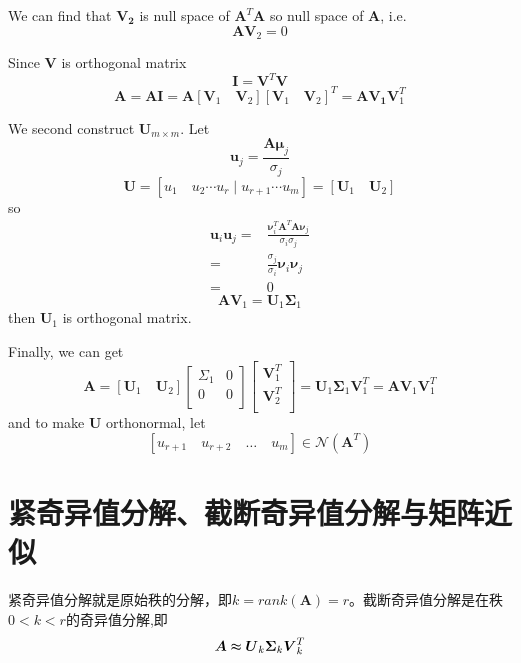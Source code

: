 \documentclass{article}
\begin{document}
        We can find that $\boldsymbol{V_2}$ is null space of $\boldsymbol{A}^T\boldsymbol{A}$ so null space of $\boldsymbol{A}$, i.e.
        \[\boldsymbol{A}\boldsymbol{V}_2=0\]

        Since $\boldsymbol{V}$ is orthogonal matrix
        \[\boldsymbol{I}=\boldsymbol{V}^T\boldsymbol{V}\]
        \[\boldsymbol{A}=\boldsymbol{A}\boldsymbol{I}=\boldsymbol{A}[\boldsymbol{V}_1\quad\boldsymbol{V}_2][\boldsymbol{V}_1\quad\boldsymbol{V}_2]^T=\boldsymbol{A}\boldsymbol{V_1}\boldsymbol{V}_1^T\]

        We second construct $\boldsymbol{U}_{m\times m}$. Let
        \[\boldsymbol{u}_j=\frac{\boldsymbol{A}\boldsymbol{\mu}_j}{\sigma_j}\]
        \[\boldsymbol{U}=[u_1\quad u_2\cdots u_r \mid u_{r+1}\cdots u_m]=[\boldsymbol{U}_1\quad\boldsymbol{U}_2]\]
        so
        \begin{align*}
            \boldsymbol{u}_i\boldsymbol{u}_j=&\frac{\boldsymbol{\nu}_i^T\boldsymbol{A}^T\boldsymbol{A}\boldsymbol{\nu}_j}{\sigma_i\sigma_j}\\
                =&\frac{\sigma_j}{\sigma_i}\boldsymbol{\nu}_i\boldsymbol{\nu}_j\\
                =&0
        \end{align*}
        \[\boldsymbol{A}\boldsymbol{V}_1=\boldsymbol{U}_1\boldsymbol{\Sigma}_1\]
        then $\boldsymbol{U}_1$ is orthogonal matrix.

        Finally, we can get
        \[\boldsymbol{A}=[\boldsymbol{U}_1 \quad\boldsymbol{U}_2]
            \begin{bmatrix}
                \Sigma_1&0\\
                0&0\\
            \end{bmatrix}
            \begin{bmatrix}
                \boldsymbol{V}_1^T\\
                \boldsymbol{V}_2^T\\
            \end{bmatrix}
            =\boldsymbol{U}_1\boldsymbol{\Sigma}_1\boldsymbol{V}_1^T
            =\boldsymbol{A}\boldsymbol{V}_1\boldsymbol{V}_1^T
        \]
        and to make $\boldsymbol{U}$ orthonormal, let
        \[[u_{r+1}\quad u_{r+2} \quad\dots\quad u_m]\in \mathcal{N}(\boldsymbol{A}^T)\]
        
    \section{紧奇异值分解、截断奇异值分解与矩阵近似}
        紧奇异值分解就是原始秩的分解，即$k=rank(\boldsymbol{A})=r$。截断奇异值分解是在秩$0<k<r$的奇异值分解,即
        \[\boldsymbol{A}\thickapprox  \boldsymbol{U}_k\boldsymbol{\Sigma}_k\boldsymbol{V}_k^T\]
\end{document}
